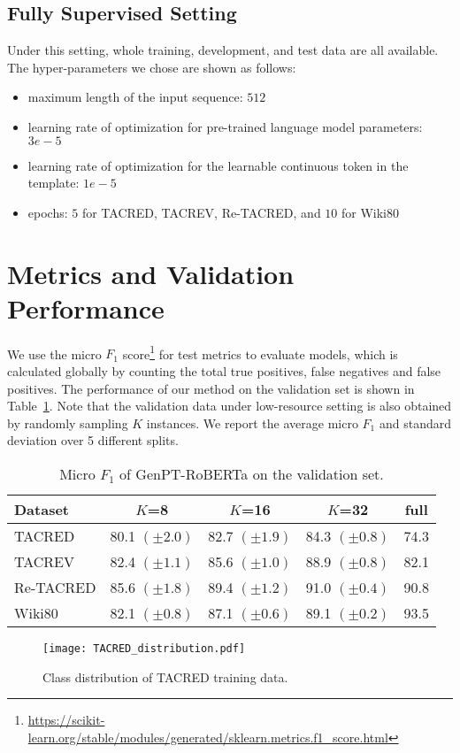 \documentclass[11pt]{article}
\begin{document}
\subsection{Fully Supervised Setting}
Under this setting, whole training, development, and test data are all available. The hyper-parameters we chose are shown as follows:
\begin{itemize}
	\item maximum length of the input sequence: $512$
	\item learning rate of optimization for pre-trained language model parameters: $3e-5$
	\item learning rate of optimization for the learnable continuous token in the template: $1e-5$
	\item epochs: $5$ for TACRED, TACREV, Re-TACRED,  and $10$ for Wiki80
\end{itemize}
\section{Metrics and Validation Performance}
We use the micro $F_1$ score\footnote{\url{https://scikit-learn.org/stable/modules/generated/sklearn.metrics.f1_score.html}} for test metrics to evaluate models, which is calculated globally by counting the total true positives, false negatives and false positives. The performance of our method on the validation set is shown in Table~\ref{validation}. Note that the validation data under low-resource setting is also obtained by randomly sampling $K$ instances. We report the average micro $F_1$ and standard deviation over 5 different splits.
\begin{table}[h]
	\centering
\scalebox{0.7}
	{
		\begin{tabular}{lcccc}  
			\toprule
Dataset &$K$=8&$K$=16&$K$=32&full\\\midrule
			TACRED&80.1 \small{$(\pm2.0)$}&82.7 \small{$(\pm1.9)$}&84.3 \small{$(\pm0.8)$}&74.3\\
			TACREV& 82.4 \small{$(\pm1.1)$} & 85.6 \small{$(\pm1.0)$} & 88.9 \small{$(\pm0.8)$} &82.1\\
			Re-TACRED& 85.6 \small{$(\pm1.8)$} &89.4 \small{$(\pm1.2)$}&91.0 \small{$(\pm0.4)$}&90.8\\
			Wiki80& 82.1 \small{$(\pm0.8)$} & 87.1 \small{$(\pm0.6)$} & 89.1 \small{$(\pm0.2)$} &93.5\\
			\bottomrule
		\end{tabular}
	}
	\caption{
		Micro $F_1$ of GenPT-RoBERTa on the validation set.}
	\label{validation}
\end{table}
\begin{figure*}[t]
\centering
	\texttt{[image: TACRED\_distribution.pdf]}
	\caption{Class distribution of TACRED training data.}
	\label{class_distribution} 
\end{figure*}
\end{document}
